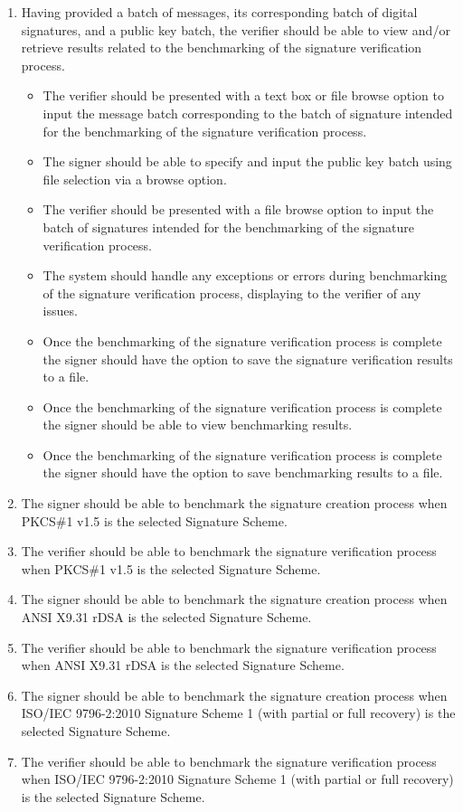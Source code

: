 \documentclass[]{final_report}
\theoremstyle{definition}
\begin{document}
\begin{enumerate}
\item Having provided a batch of messages, its corresponding batch of digital signatures, and a public key batch, the verifier should be able to view and/or retrieve results related to the benchmarking of the signature verification process.
\begin{itemize}
\item The verifier should be presented with a text box or file browse option to input the message batch corresponding to the batch of signature intended for the benchmarking of the signature verification process.
\item The signer should be able to specify and input the public key batch using file selection via a browse option.
\item The verifier should be presented with a file browse option to input the batch of signatures intended for the benchmarking of the signature verification process.
\item The system should handle any exceptions or errors during benchmarking of the signature verification process, displaying to the verifier of any issues.
\item Once the benchmarking of the signature verification process is complete the signer should have the option to save the signature verification results to a file.
\item Once the benchmarking of the signature verification process is complete the signer should be able to view benchmarking results.
\item Once the benchmarking of the signature verification process is complete the signer should have the option to save benchmarking results to a file.
\end{itemize}
\item The signer should be able to benchmark the signature creation process when PKCS\#1 v1.5 is the selected Signature Scheme.
\item The verifier should be able to benchmark the signature verification process when PKCS\#1 v1.5 is the selected Signature Scheme.
\item The signer should be able to benchmark the signature creation process when ANSI X9.31 rDSA is the selected Signature Scheme.
\item The verifier should be able to benchmark the signature verification process when ANSI X9.31 rDSA is the selected Signature Scheme.
\item The signer should be able to benchmark the signature creation process when ISO/IEC 9796-2:2010 Signature Scheme 1 (with partial or full recovery) is the selected Signature Scheme.
\item The verifier should be able to benchmark the signature verification process when ISO/IEC 9796-2:2010 Signature Scheme 1 (with partial or full recovery) is the selected Signature Scheme.
\end{enumerate}
\end{document}
